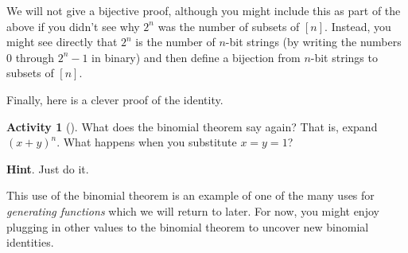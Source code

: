 \documentclass[10pt,]{book}
\theoremstyle{plain}
\theoremstyle{definition}
\theoremstyle{definition}
\theoremstyle{definition}
\newtheorem{activity}[project]{Activity}
\theoremstyle{definition}
\numberwithin{equation}{chapter}
\begin{document}
\hypertarget{p-491}{}%
We will not give a bijective proof, although you might include this as part of the above if you didn't see why \(2^n\) was the number of subsets of \([n]\).  Instead, you might see directly that \(2^n\) is the number of \(n\)-bit strings (by writing the numbers 0 through \(2^n - 1\) in binary) and then define a bijection from \(n\)-bit strings to subsets of \([n]\).%
\par
\hypertarget{p-492}{}%
Finally, here is a clever proof of the identity.%
\begin{activity}[]\label{act-pascalrowsum-binom}
\hypertarget{p-493}{}%
What does the binomial theorem say again?  That is, expand \((x+y)^n\).  What happens when you substitute \(x = y = 1\)?%
\par\smallskip%
\noindent\textbf{Hint}.\hypertarget{hint-13}{}\quad%
\hypertarget{p-494}{}%
Just do it.%
\end{activity}
\hypertarget{p-495}{}%
This use of the binomial theorem is an example of one of the many uses for \emph{generating functions} which we will return to later.  For now, you might enjoy plugging in other values to the binomial theorem to uncover new binomial identities.%
\typeout{************************************************}
\typeout{************************************************}
\end{document}
